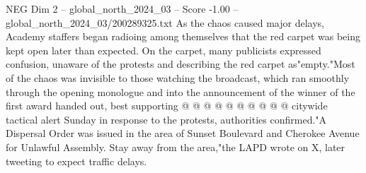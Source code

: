 \begin{textsample}{NEG Dim 2 – global\_north\_2024\_03 – Score -1.00 – global\_north\_2024\_03/200289325.txt}
As the chaos caused major delays, Academy staffers began radioing among themselves that the red carpet was being kept open later than expected.
On the carpet, many publicists expressed confusion, unaware of the protests and describing the red carpet as"empty."Most of the chaos was invisible to those watching the broadcast, which ran smoothly through the opening monologue and into the announcement of the winner of the first award handed out, best supporting @ @ @ @ @ @ @ @ @ @ citywide tactical alert Sunday in response to the protests, authorities confirmed."A Dispersal Order was issued in the area of Sunset Boulevard and Cherokee Avenue for Unlawful Assembly.
Stay away from the area,"the LAPD wrote on X, later tweeting to expect traffic delays.

\end{textsample}
